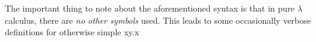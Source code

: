 \documentclass{article}
\begin{document}
The important thing to note about the aforementioned syntax is that in pure $\lambda$ calculus, there are \textit{no other symbols} used. This leads to some occasionally verbose definitions for otherwise simple
$$\lambda xy.x
\cite{horowitz}


\end{document}
